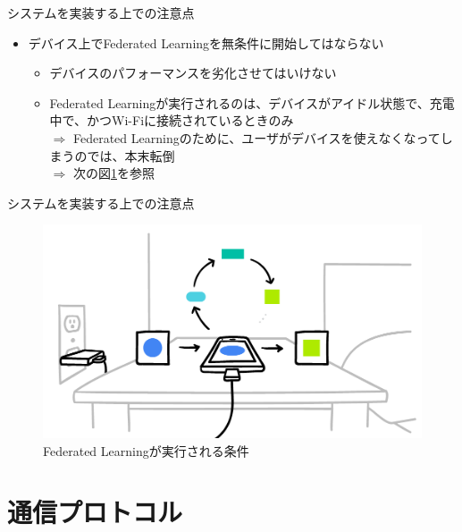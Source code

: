 \documentclass[dvipdfmx,notheorems,t]{beamer}
\begin{document}
\begin{frame}{システムを実装する上での注意点}

\begin{itemize}
	\item デバイス上でFederated Learningを無条件に開始してはならない
	\begin{itemize}
		\item デバイスのパフォーマンスを劣化させてはいけない
		\newline
		
		\item Federated Learningが実行されるのは、デバイスが\alert{アイドル状態}で、\alert{充電中}で、かつ\alert{Wi-Fiに接続}されているときのみ \\
		$\Rightarrow$ Federated Learningのために、ユーザがデバイスを使えなくなってしまうのでは、本末転倒 \\
		$\Rightarrow$ 次の図\ref{fig:federated-learning-eligibility}を参照
	\end{itemize}
\end{itemize}

\end{frame}

\begin{frame}{システムを実装する上での注意点}

\begin{figure}
	\centering
	\includegraphics[keepaspectratio, scale=0.3]{federated-learning-eligibility.png}
	\caption{Federated Learningが実行される条件~\cite{mcmahan_ramage_2017}}
	\label{fig:federated-learning-eligibility}
\end{figure}

\end{frame}

\section{通信プロトコル}
\end{document}
